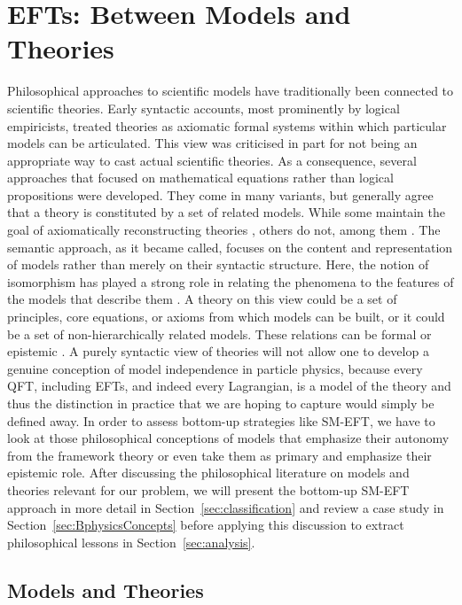 \section{EFTs: Between Models and Theories} 		%
\label{sec:models} 

Philosophical approaches to scientific models have traditionally been connected to scientific theories. 
Early syntactic accounts, most prominently by logical empiricists, treated theories as axiomatic formal systems \citep[such as][]{carnap59,hempel66}
within which particular models can be articulated.
This view was criticised in part for not being an appropriate way to cast actual scientific theories. 
As a consequence, several approaches that focused on mathematical equations rather than logical propositions were developed.
They come in many variants, but generally agree that a theory is constituted by a set of related models. 
While some maintain the goal of axiomatically reconstructing theories \citep[among them][]{suppes60}, others do not, among them \citep{giere88}.
The semantic approach, as it became called, focuses on the content and representation of models rather than merely on their syntactic structure.
Here, the notion of isomorphism has played a strong role in relating the phenomena to the features of the models that describe them \citep{vf80}. 
A theory on this view could be a set of principles, core equations, or axioms from which models can be built, or it could be a set of non-hierarchically related models. These relations can be formal \citep{suppes60} or epistemic \citep{giere88}.
A purely syntactic view of theories will not allow one to develop a genuine conception of model independence in particle physics, because every QFT, including EFTs, and indeed every Lagrangian, is a model of the theory and thus the distinction in practice that we are hoping to capture would simply be defined away. 
In order to assess bottom-up strategies like SM-EFT, we have to look at those philosophical conceptions of models that emphasize their autonomy from the framework theory or even take them as primary and emphasize their epistemic role. 
After discussing the philosophical literature on models and theories relevant for our problem, we will present the bottom-up SM-EFT approach in more detail in Section~\ref{sec:classification} and review a case study in Section~\ref{sec:BphysicsConcepts} before applying this discussion to extract philosophical lessons in Section~\ref{sec:analysis}.

\subsection{Models and Theories}
\label{sub:modeltheory}

